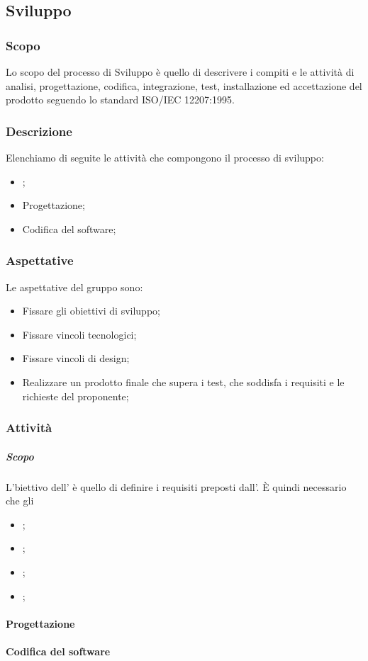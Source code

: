 \subsection{Sviluppo}
\subsubsection{Scopo}
Lo scopo del processo di Sviluppo è quello di descrivere i compiti e le attività di analisi, progettazione, codifica, integrazione, test, installazione ed accettazione del prodotto seguendo lo standard ISO/IEC 12207:1995.
\subsubsection{Descrizione}
Elenchiamo di seguite le attività che compongono il processo di sviluppo:
\begin{itemize}
    \item{\AdR{};}
    \item{Progettazione;}
    \item{Codifica del software;}
\end{itemize}

\subsubsection{Aspettative}
Le aspettative del gruppo sono:
\begin{itemize}
    \item{Fissare gli obiettivi di sviluppo;}
    \item{Fissare vincoli tecnologici;}
    \item{Fissare vincoli di design;}
    \item{Realizzare un prodotto finale che supera i test, che soddisfa i requisiti e le richieste del proponente;}
\end{itemize}

\subsubsection{Attività}
\paragraph{\AdR{}}
\subparagraph{Scopo} L'biettivo dell'\AdRv{} è quello di definire i requisiti preposti dall'\proponProg{}. È quindi necessario che gli \analProg
\begin{itemize}
    \item{;}
    \item{;}
    \item{;}
    \item{;}
\end{itemize}




\paragraph{Progettazione}


\paragraph{Codifica del software}